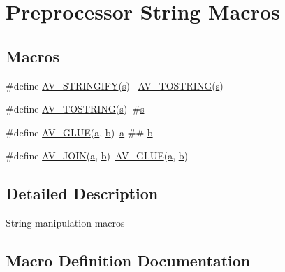 \hypertarget{group__preproc__misc}{}\section{Preprocessor String Macros}
\label{group__preproc__misc}
\subsection*{Macros}
\begin{DoxyCompactItemize}
\item 
\#define \hyperlink{group__preproc__misc_ga5b0c9c086e1fd9b7cd907dfa075f7f5b}{A\+V\+\_\+\+S\+T\+R\+I\+N\+G\+I\+FY}(\hyperlink{lib_2expat_8h_a755339d27872b13735c2cab829e47157}{s})              ~\hyperlink{group__preproc__misc_gab84735755e42325d114a7b857051ad3e}{A\+V\+\_\+\+T\+O\+S\+T\+R\+I\+NG}(\hyperlink{lib_2expat_8h_a755339d27872b13735c2cab829e47157}{s})
\item 
\#define \hyperlink{group__preproc__misc_gab84735755e42325d114a7b857051ad3e}{A\+V\+\_\+\+T\+O\+S\+T\+R\+I\+NG}(\hyperlink{lib_2expat_8h_a755339d27872b13735c2cab829e47157}{s})~\#\hyperlink{lib_2expat_8h_a755339d27872b13735c2cab829e47157}{s}
\item 
\#define \hyperlink{group__preproc__misc_ga6b8f87a77e64c17b77f724369ac1d9ab}{A\+V\+\_\+\+G\+L\+UE}(\hyperlink{rfft2d_test_m_l_8m_a4124bc0a9335c27f086f24ba207a4912}{a},  \hyperlink{convtest_8m_a21ad0bd836b90d08f4cf640b4c298e7c}{b})~\hyperlink{rfft2d_test_m_l_8m_a4124bc0a9335c27f086f24ba207a4912}{a} \#\# \hyperlink{convtest_8m_a21ad0bd836b90d08f4cf640b4c298e7c}{b}
\item 
\#define \hyperlink{group__preproc__misc_ga27b8f6fda860b2b08779de5d633e3623}{A\+V\+\_\+\+J\+O\+IN}(\hyperlink{rfft2d_test_m_l_8m_a4124bc0a9335c27f086f24ba207a4912}{a},  \hyperlink{convtest_8m_a21ad0bd836b90d08f4cf640b4c298e7c}{b})~\hyperlink{group__preproc__misc_ga6b8f87a77e64c17b77f724369ac1d9ab}{A\+V\+\_\+\+G\+L\+UE}(\hyperlink{rfft2d_test_m_l_8m_a4124bc0a9335c27f086f24ba207a4912}{a}, \hyperlink{convtest_8m_a21ad0bd836b90d08f4cf640b4c298e7c}{b})
\end{DoxyCompactItemize}


\subsection{Detailed Description}
String manipulation macros 

\subsection{Macro Definition Documentation}
